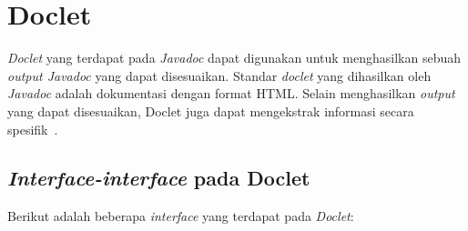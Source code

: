 \section{Doclet}
\label{sec:doclet}
{\it Doclet} yang terdapat pada {\it Javadoc} dapat digunakan untuk menghasilkan sebuah {\it output Javadoc} yang dapat disesuaikan. Standar {\it doclet} yang dihasilkan oleh {\it Javadoc} adalah dokumentasi dengan format HTML. Selain menghasilkan {\it output} yang dapat disesuaikan, Doclet juga dapat mengekstrak informasi secara spesifik~\cite{doclet:02:doclet}.

\subsection{\textit{Interface-interface} pada Doclet}
\label{sec:interface-doclet}
Berikut adalah beberapa {\it interface} yang terdapat pada {\it Doclet}:
